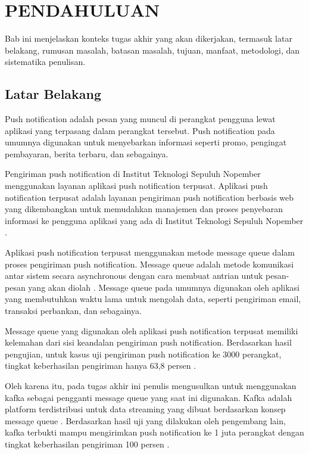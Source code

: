 \vspace{0ex}
\chapter {PENDAHULUAN}
\par Bab ini menjelaskan konteks tugas akhir yang akan dikerjakan, termasuk latar belakang, rumusan masalah, batasan masalah, tujuan, manfaat, metodologi, dan sistematika penulisan.

\section{Latar Belakang}
\par Push notification adalah pesan yang muncul di perangkat pengguna lewat aplikasi yang terpasang dalam perangkat tersebut. Push notification pada umumnya digunakan untuk menyebarkan informasi seperti promo, pengingat pembayaran, berita terbaru, dan sebagainya.
\par Pengiriman push notification di Institut Teknologi Sepuluh Nopember menggunakan layanan aplikasi push notification terpusat. Aplikasi push notification terpusat adalah layanan pengiriman push notification berbasis web yang dikembangkan untuk memudahkan manajemen dan proses penyebaran informasi ke pengguna aplikasi yang ada di Institut Teknologi Sepuluh Nopember \cite{application-thesis}.
\par Aplikasi push notification terpusat menggunakan metode message queue dalam proses pengiriman push notification. Message queue adalah metode komunikasi antar sistem secara asynchronous dengan cara membuat antrian untuk pesan-pesan yang akan diolah \cite{message-queue-online}. Message queue pada umumnya digunakan oleh aplikasi yang membutuhkan waktu lama untuk mengolah data, seperti pengiriman email, transaksi perbankan, dan sebagainya.
\par Message queue yang digunakan oleh aplikasi push notification terpusat memiliki kelemahan dari sisi keandalan pengiriman push notification. Berdasarkan hasil pengujian, untuk kasus uji pengiriman push notification ke 3000 perangkat, tingkat keberhasilan pengiriman hanya 63,8 persen \cite{application-thesis}.
\par Oleh karena itu, pada tugas akhir ini penulis mengusulkan untuk menggunakan kafka sebagai pengganti message queue yang saat ini digunakan. Kafka adalah platform terdistribusi untuk data streaming yang dibuat berdasarkan konsep message queue \cite{kafka-online}. Berdasarkan hasil uji yang dilakukan oleh pengembang lain, kafka terbukti mampu mengirimkan push notification ke 1 juta perangkat dengan tingkat keberhasilan pengiriman 100 persen \cite{prototype-article}.

